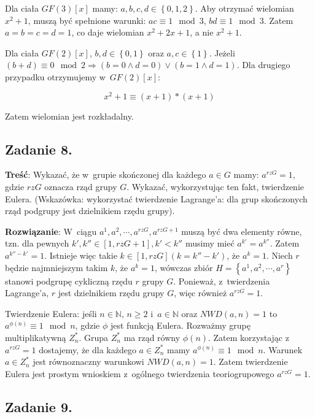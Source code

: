 \documentclass[a4paper,10pt, twocolumn]{article}
\begin{document}
Dla ciała $GF(3)[x]$ mamy:
$a, b, c, d \in \left\{0, 1, 2\right\}$.
Aby otrzymać wielomian $x^2 + 1$, muszą być spełnione warunki:
$ac \equiv 1 \mod 3$,
$bd \equiv 1 \mod 3$.
Zatem $a = b = c = d = 1$, co daje wielomian $x^2 + 2x + 1$, a nie $x^2 + 1$.

Dla ciała $GF(2)[x]$, $b, d \in \left\{0, 1\right\}$ oraz $a, c \in \left\{1\right\}$. Jeżeli $(b + d) \equiv 0 \mod 2 \Rightarrow (b = 0 \wedge d = 0) \vee (b = 1 \wedge d = 1)$. Dla drugiego przypadku otrzymujemy w~$GF(2)[x]$:

\begin{equation*}
 x^{2} + 1 \equiv (x+1) * (x+1)
\end{equation*}

Zatem wielomian jest rozkładalny.

\subsection{Zadanie 8.}

\textbf{Treść}: Wykazać, że w~grupie skończonej dla każdego $a \in G$ mamy: $a^{rzG} = 1$, gdzie $rzG$ oznacza rząd grupy $G$. Wykazać, wykorzystując ten fakt, twierdzenie Eulera. (Wskazówka: wykorzystać twierdzenie Lagrange'a: dla grup skończonych rząd podgrupy jest dzielnikiem rzędu grupy).

\textbf{Rozwiązanie}: W~ciągu $a^{1}, a^{2}, \cdots, a^{rzG}, a^{rzG + 1}$ muszą być dwa elementy równe, tzn. dla pewnych $k', k'' \in [1, rzG + 1], k' < k''$ musimy mieć $a^{k'} = a^{k''}$. Zatem $a^{k'' - k'} = 1$. Istnieje więc takie $k \in [1, rzG] (k = k'' - k')$, że $a^{k} = 1$. Niech $r$ będzie najmniejszym takim $k$, że $a^{k} = 1$, wówczas zbiór $H = \left\{a^{1}, a^{2}, \cdots, a^{r}\right\}$ stanowi podgrupę cykliczną rzędu $r$ grupy $G$. Ponieważ, z~twierdzenia Lagrange'a, $r$ jest dzielnikiem rzędu grupy $G$, więc również $a^{rzG} = 1$.

\noindent Twierdzenie Eulera: jeśli $n \in \mathbb{N}$, $n \geq 2$ i~$a \in \mathbb{N}$ oraz $NWD(a, n) = 1$ to $a^{\phi(n)} \equiv 1 \mod n$, gdzie $\phi$ jest funkcją Eulera. Rozważmy grupę multiplikatywną $Z_{n}^{*}$. Grupa $Z_{n}^{*}$ ma rząd równy $\phi(n)$. Zatem korzystając z~$a^{rzG} = 1$ dostajemy, że dla każdego $a \in Z_{n}^{*}$ mamy $a^{\phi(n)} \equiv 1 \mod n$. Warunek $a \in Z_{n}^{*}$ jest równoznaczny warunkowi $NWD(a, n) = 1$. Zatem twierdzenie Eulera jest prostym wnioskiem z~ogólnego twierdzenia teoriogrupowego $a^{rzG} = 1$.

\subsection{Zadanie 9.}
\end{document}
